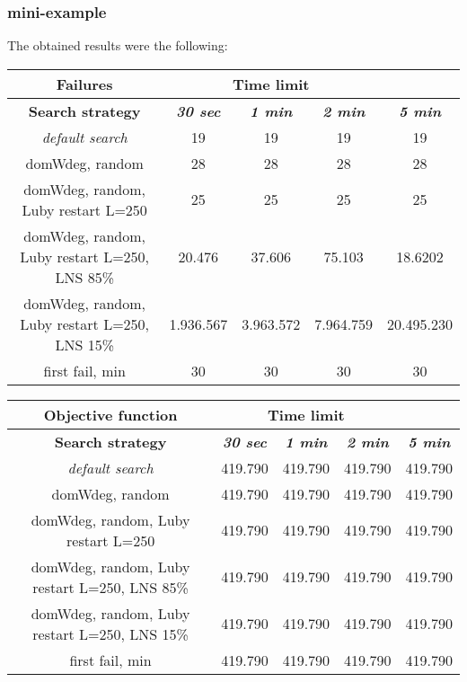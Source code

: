 \subsubsection{mini-example}
The obtained results were the following:
{
\renewcommand{\arraystretch}{2}
\begin{longtable}[h]{| c | c | c | c | c |}
    \hline
    \textbf{Failures} & \multicolumn{3}{c}{Time limit} & \\
    \hline
    \textbf{Search strategy} & \textbf{\textit{30 sec}} & \textbf{\textit{1 min}} & \textbf{\textit{2 min}} & \textbf{\textit{5 min}} \\
    \hline
    \endhead
    \textit{default search}                       &      19 &      19 &      19 &       19 \\
    \hline
    domWdeg, random                               &      28 &      28 &      28 &       28 \\
    \hline
    domWdeg, random, Luby restart L=250           &      25 &      25 &      25 &       25 \\
    \hline
    domWdeg, random, Luby restart L=250, LNS 85\% &   20.476 &   37.606 &   75.103 &   18.6202 \\
    \hline
    domWdeg, random, Luby restart L=250, LNS 15\% & 1.936.567 & 3.963.572 & 7.964.759 & 20.495.230 \\
    \hline
    first fail, min                               &      30 &      30 &      30 &       30 \\
    \hline
\end{longtable}
}

{
\renewcommand{\arraystretch}{2}
\begin{longtable}[h]{| c | c | c | c | c |}
    \hline
    \textbf{Objective function} & \multicolumn{3}{c}{Time limit} & \\
    \hline
    \textbf{Search strategy} & \textbf{\textit{30 sec}} & \textbf{\textit{1 min}} & \textbf{\textit{2 min}} & \textbf{\textit{5 min}} \\
    \hline
    \endhead
    \textit{default search}                       & 419.790 & 419.790 & 419.790 & 419.790 \\
    \hline
    domWdeg, random                               & 419.790 & 419.790 & 419.790 & 419.790 \\
    \hline
    domWdeg, random, Luby restart L=250           & 419.790 & 419.790 & 419.790 & 419.790 \\
    \hline
    domWdeg, random, Luby restart L=250, LNS 85\% & 419.790 & 419.790 & 419.790 & 419.790 \\
    \hline
    domWdeg, random, Luby restart L=250, LNS 15\% & 419.790 & 419.790 & 419.790 & 419.790 \\
    \hline
    first fail, min                               & 419.790 & 419.790 & 419.790 & 419.790 \\
    \hline
\end{longtable}
}

